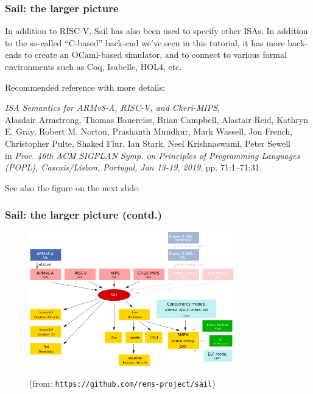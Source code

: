 \documentclass[aspectratio=169]{beamer}
\newcommand{\slidefont}{\scriptsize}
\begin{document}
\begin{frame}
  \frametitle{Sail: the larger picture}

  \slidefont

  In addition to RISC-V, Sail has also been used to specify other
  ISAs.  In addition to the so-called ``C-based'' back-end we've seen
  in this tutorial, it has more back-ends to create an OCaml-based
  simulator, and to connect to various formal environments such as
  Coq, Isabelle, HOL4, etc.

  \vspace{2ex}

  Recommended reference with more details:
  
  \vspace{2ex}

  \hfill \begin{minipage}{0.95\textwidth}
    \emph{ISA Semantics for ARMv8-A, RISC-V, and Cheri-MIPS}, \\
    Alasdair Armstrong,
    Thomas Bauereiss,
    Brian Campbell,
    Alastair Reid,
    Kathryn E. Gray,
    Robert M. Norton,
    Prashanth Mundkur,
    Mark Wassell,
    Jon French,
    Christopher Pulte,
    Shaked Flur,
    Ian Stark,
    Neel Krishnaswami,
    Peter Sewell \\
    in \emph{Proc. 46th ACM SIGPLAN Symp. on Principles of Programming
    Languages (POPL), Cascais/Lisbon, Portugal, Jan 13-19, 2019},
    pp. 71:1--71:31.
  \end{minipage}

  \vspace{2ex}

  See also the figure on the next slide.
\end{frame}


\begin{frame}
  \frametitle{Sail: the larger picture (contd.)}

  \begin{figure}[htbp]
    \centerline{\includegraphics[height=2.3in]{Figures/overview-sail.png}}
    {\scriptsize (from: {\tt https://github.com/rems-project/sail})}
  \end{figure}

\end{frame}
\end{document}
